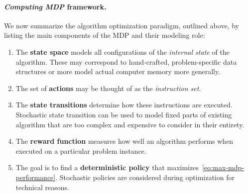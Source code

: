 \documentclass[a4paper]{report}
\theoremstyle{definition}
\theoremstyle{plain}
\begin{document}
\pagebreak[4]
\paragraph{\textit{Computing MDP} framework.}

We now summarize the algorithm optimization paradigm, outlined above, by listing
the main components of the MDP and their modeling role:

\begin{mdframed}
\begin{enumerate}[label=$\bullet$,leftmargin=2.5em,rightmargin=4em,midpenalty=5]
  \item The \textbf{state space} models all configurations of the \emph{internal state}
        of the algorithm. These may correspond to hand-crafted, problem-specific
        data structures or more model actual computer memory more generally.

  \item The set of \textbf{actions} may be thought of as the \emph{instruction set}.

  \item The \textbf{state transitions} determine how these instructions are executed.
        Stochastic state transition can be used to model fixed parts of existing
        algorithm that are too complex and expensive to consider in their
        entirety.

  \item The \textbf{reward function} measures how well an algorithm performs when
        executed on a particular problem instance.

  \item The goal is to find a \textbf{deterministic policy} that
        maximizes~\eqref{eq:max-mdp-performance}. Stochastic policies are
        considered during optimization for technical reasons.
\end{enumerate}
\end{mdframed}


\end{document}
